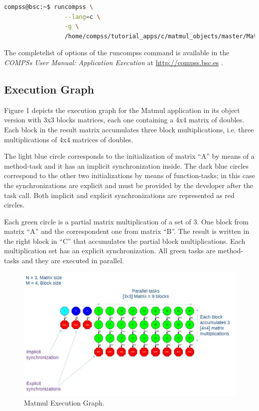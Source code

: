 \begin{lstlisting}[language=bash]
compss@bsc:~$ runcompss \
                 --lang=c \
                 -g \
                 /home/compss/tutorial_apps/c/matmul_objects/master/Matmul 3 4 2.0
\end{lstlisting}

The completelist of options of the runcompss command is available in the \textit{COMPSs User Manual: Application
Execution} at \url{http://compss.bsc.es} . 

\subsection{Execution Graph}
Figure 1 depicts the execution graph for the Matmul application in its object version with 3x3 blocks matrices, each one containing a 4x4 matrix of doubles.
Each block in the result matrix accumulates three block multiplications, i.e. three multiplications of 4x4 matrices of doubles.

The light blue circle corresponds to the initialization of matrix ``A'' by means of a method-task and it has 
an implicit synchronization inside. The dark blue circles correspond to the other two initializations by 
means of function-tasks; in this case the synchronizations are explicit and must be provided by the developer after the 
task call. Both implicit and explicit synchronizations are represented as red circles.

Each green circle is a partial matrix multiplication of a set of 3. One block from matrix ``A'' and the 
correspondent one from matrix ``B''. The result is written in the right block in ``C'' that accumulates 
the partial block multiplications. Each multiplication set has an explicit synchronization. 
All green tasks are method-tasks and they are executed in parallel.

\begin{figure}[ht!]
  \centering
    \includegraphics[width=1.0\textwidth]{./Sections/4_C/Figures/matmul.jpeg}
    \caption{Matmul Execution Graph.}
\end{figure}
